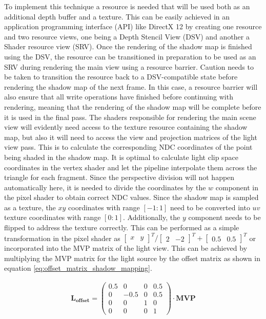 To implement this technique a resource is needed that will be used both as an additional depth buffer and a texture. This can be easily achieved in an application programming interface (API) like DirectX 12 by creating one resource and two resource views, one being a Depth Stencil View (DSV) and another a Shader resource view (SRV). Once the rendering of the shadow map is finished using the DSV, the resource can be transitioned in preparation to be used as an SRV during rendering the main view using a resource barrier. Caution needs to be taken to transition the resource back to a DSV-compatible state before rendering the shadow map of the next frame. In this case, a resource barrier will also ensure that all write operations have finished before continuing with rendering, meaning that the rendering of the shadow map will be complete before it is used in the final pass. The shaders responsible for rendering the main scene view will evidently need access to the texture resource containing the shadow map, but also it will need to access the view and projection matrices of the light view pass. This is to calculate the corresponding NDC coordinates of the point being shaded in the shadow map. It is optimal to calculate light clip space coordinates in the vertex shader and let the pipeline interpolate them across the triangle for each fragment. Since the perspective division will not happen automatically here, it is needed to divide the coordinates by the \(w\) component in the pixel shader to obtain correct NDC values. Since the shadow map is sampled as a texture, the \(xy\) coordinates with range \([-1:1]\) need to be converted into \(uv\) texture coordinates with range \([0:1]\). Additionally, the \(y\) component needs to be flipped to address the texture correctly. This can be performed as a simple transformation in the pixel shader as \(\begin{bmatrix}x & y\end{bmatrix}^T /  \begin{bmatrix}2 & -2\end{bmatrix}^T + \begin{bmatrix}0.5 & 0.5\end{bmatrix}^T\) or incorporated into the MVP matrix of the light view. This can be achieved by multiplying the MVP matrix for the light source by the offset matrix as shown in equation \ref{eq:offset_matrix_shadow_mapping}.

\begin{align}
	\label{eq:offset_matrix_shadow_mapping}
	\mathbf{L_{offset}} = 
	\begin{pmatrix}
		0.5 & 0 & 0 & 0.5\\
		0 & -0.5 & 0 & 0.5\\
		0 & 0 & 1 & 0\\
		0 & 0 & 0 & 1
	\end{pmatrix}
	\cdot \mathbf{MVP}
\end{align}

